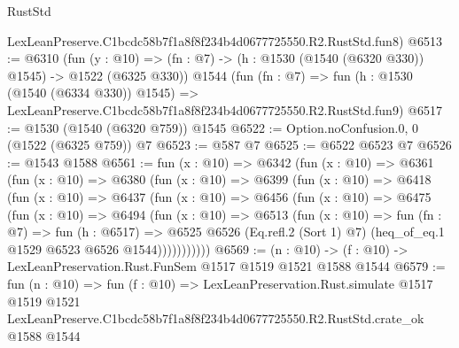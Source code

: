 \begin{lexlean}{RustStd}
\begin{coremodule}
    LexLeanPreserve.C1bcdc58b7f1a8f8f234b4d0677725550.R2.RustStd.fun8)
@6513 := @6310
    (fun (y : @10) => (fn : @7) -> (h : @1530 (@1540 (@6320 @330)) @1545) -> @1522 (@6325 @330))
    @1544
    (fun (fn : @7) =>
    fun (h : @1530 (@1540 (@6334 @330)) @1545) =>
    LexLeanPreserve.C1bcdc58b7f1a8f8f234b4d0677725550.R2.RustStd.fun9)
@6517 := @1530 (@1540 (@6320 @759)) @1545
@6522 := Option.noConfusion.{0, 0} (@1522 (@6325 @759)) @7
@6523 := @587 @7
@6525 := @6522 @6523 @7
@6526 := @1543 @1588
@6561 := fun (x : @10) =>
  @6342
    (fun (x : @10) =>
    @6361
      (fun (x : @10) =>
      @6380
        (fun (x : @10) =>
        @6399
          (fun (x : @10) =>
          @6418
            (fun (x : @10) =>
            @6437
              (fun (x : @10) =>
              @6456
                (fun (x : @10) =>
                @6475
                  (fun (x : @10) =>
                  @6494
                    (fun (x : @10) =>
                    @6513
                      (fun (x : @10) =>
                      fun (fn : @7) =>
                      fun (h : @6517) =>
                      @6525
                        @6526
                        (Eq.refl.{2} (Sort 1) @7)
                        (heq_of_eq.{1} @1529 @6523 @6526 @1544)))))))))))
@6569 := (n : @10) -> (f : @10) -> LexLeanPreservation.Rust.FunSem @1517 @1519 @1521 @1588 @1544
@6579 := fun (n : @10) =>
  fun (f : @10) =>
  LexLeanPreservation.Rust.simulate
    @1517
    @1519
    @1521
    LexLeanPreserve.C1bcdc58b7f1a8f8f234b4d0677725550.R2.RustStd.crate_ok
    @1588
    @1544
\end{coremodule}
\end{lexlean}

